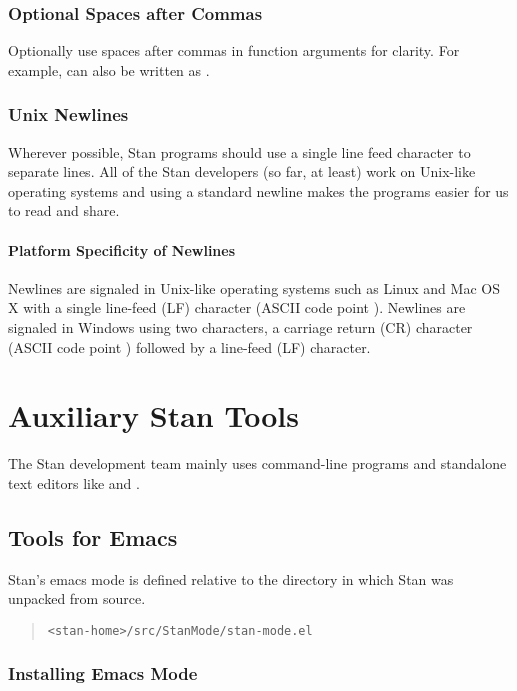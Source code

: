 \subsection{Optional Spaces after Commas}

Optionally use spaces after commas in function arguments for clarity.
For example,  can also be
written as .



\subsection{Unix Newlines}

Wherever possible, Stan programs should use a single line feed 
character to separate lines.  All of the Stan developers (so far, at 
least) work on Unix-like operating systems and using a standard 
newline makes the programs easier for us to read and share.  

\subsubsection{Platform Specificity of Newlines}

Newlines are signaled in Unix-like operating systems such as Linux and
Mac OS X with a single line-feed (LF) character (ASCII code point
).  Newlines are signaled in Windows using two characters,
a carriage return (CR) character (ASCII code point )
followed by a line-feed (LF) character.


\chapter{Auxiliary Stan Tools}

The Stan development team mainly uses command-line programs and
standalone text editors like  and .   

\section{Tools for Emacs}

Stan's emacs mode is defined relative to the directory
 in which Stan was unpacked from source.
%
\begin{quote}
\nolinkurl{<stan-home>/src/StanMode/stan-mode.el}
\end{quote}
%

\subsection{Installing Emacs Mode}

